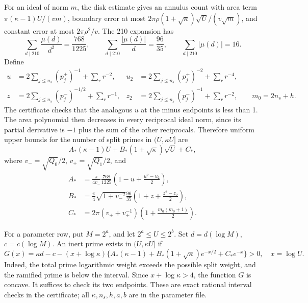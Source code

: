 \documentclass[11pt]{article}
\begin{document}
For an ideal of norm \(m\), the disk estimate gives an annulus count
with area term \(\pi(\kappa-1)U/(vm)\), boundary error at most
\(2\pi\rho(1+\sqrt\kappa)\sqrt U/(v\sqrt m)\), and constant error
at most \(2\pi\rho^2/v\). The 210 expansion has
\[
 \sum_{d\mid210}\frac{\mu(d)}{d^2}=\frac{768}{1225},\qquad
 \sum_{d\mid210}\frac{|\mu(d)|}{d}=\frac{96}{35},\qquad
 \sum_{d\mid210}|\mu(d)|=16.
\]
Define
\begin{align*}
 u&=2\sum_{j\le n_s}(p_j^+)^{-1}+\sum_{r}r^{-2},&
 u_2&=2\sum_{j\le n_s}(p_j^+)^{-2}+\sum_r r^{-4},\\
 z&=2\sum_{j\le n_s}(p_j^-)^{-1/2}+\sum_r r^{-1},&
 z_2&=2\sum_{j\le n_s}(p_j^-)^{-1}+\sum_r r^{-2},
 \qquad m_0=2n_s+h.
\end{align*}
The certificate checks that the analogous \(u\) at the minus endpoints
is less than 1. The area polynomial then decreases in every reciprocal
ideal norm, since its partial derivative is \(-1\) plus the sum of
the other reciprocals. Therefore uniform upper bounds for the number
of split primes in \((U,\kappa U]\) are
\begin{equation}\label{split-annulus}
 A_*(\kappa-1)U+B_*(1+\sqrt\kappa)\sqrt U+C_*,
\end{equation}
where \(v_-=\sqrt{Q_0}/2\), \(v_+=\sqrt{Q_1}/2\), and
\begin{align*}
 A_*&=\frac{\pi}{4v_-}\frac{768}{1225}
          \left(1-u+\frac{u^2-u_2}{2}\right),\\
 B_*&=\frac\pi4\sqrt{1+v_-^{-2}}\frac{96}{35}
          \left(1+z+\frac{z^2-z_2}{2}\right),\\
 C_*&=2\pi(v_++v_+^{-1})
          \left(1+\frac{m_0(m_0+1)}2\right).
\end{align*}

For a parameter row, put \(M=2^a\), and let
\(2^a\le U\le2^b\). Set \(d=d(\log M)\), \(c=c(\log M)\).
An inert prime exists in \((U,\kappa U]\) if
\begin{equation}\label{sieve-margin}
 G(x)=\kappa d-c-(x+\log\kappa)
 \{A_*(\kappa-1)+B_*(1+\sqrt\kappa)e^{-x/2}+C_*e^{-x}\}>0,
 \quad x=\log U.
\end{equation}
Indeed, the total prime logarithmic weight exceeds the possible split
weight, and the ramified prime is below the interval. Since
\(x+\log\kappa>4\), the function \(G\) is concave. It suffices to
check its two endpoints. These are exact rational interval checks in
the certificate; all \(\kappa,n_s,h,a,b\) are in the parameter file.
\end{document}
